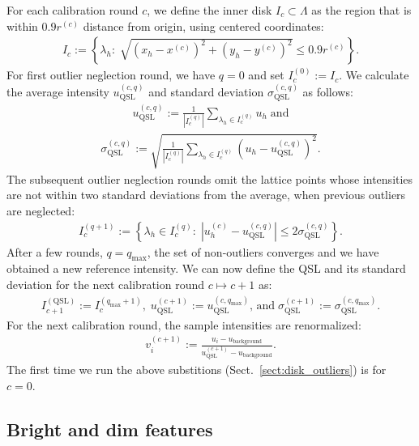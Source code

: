 \documentclass{aa}
\newcommand{\eqnl}[2]{\begin{eqnarray}\label{#1}#2\end{eqnarray}}
\newcommand{\s}[2]{{#1}_{\mathrm{#2}}}
\begin{document}
  For each calibration round $c$, we define the inner disk $I_c \subset \Lambda$ as the region that is within $0.9 r^{(c)}$ distance from origin, using centered coordinates:
  \eqnl{calib_inner_disk1}{
  I_c := \left\{ \lambda_h :\; \sqrt{\left( x_h - x^{(c)} \right)^2 + \left( y_h - y^{(c)} \right)^2} \le 0.9 r^{(c)} \right\} \text{.}
  }  
  For first outlier neglection round, we have $q=0$ and set $I_{c}^{(0)} := I_c$. We calculate the average intensity $\s{u}{QSL}^{(c,q)}$ and standard deviation $\s{\sigma}{QSL}^{(c,q)}$ as follows:
  \eqnl{calib_inner_disk2}{
  \s{u}{QSL}^{(c,q)} := \frac{1}{|I_{c}^{(q)}|} \sum \limits_{\lambda_h \in I_{c}^{(q)}} u_h \; \text{and}
  }
  \eqnl{calib_inner_disk3}{
  \s{\sigma}{QSL}^{(c,q)} := \sqrt{\frac{1}{|I_{c}^{(q)}|} \sum \limits_{\lambda_h \in I_{c}^{(q)}} \left( u_h - \s{u}{QSL}^{(c,q)} \right)^2} \text{.}
  }
  The subsequent outlier neglection rounds omit the lattice points whose intensities are not within two standard deviations from the average, when previous outliers are neglected:
  \eqnl{calib_inner_disk4}{
  I_c^{(q+1)} := \left\{ \lambda_h \in I_c^{(q)} :\; \left|u_h^{(c)} - \s{u}{QSL}^{(c,q)} \right| \le 2 \s{\sigma}{QSL}^{(c,q)} \right\} \text{.}
  }
  After a few rounds, $q = \s{q}{max}$, the set of non-outliers converges and we have obtained a new reference 
  intensity. We can now define the QSL and its standard deviation for the next calibration round $c \mapsto c+1$ as:
  \eqnl{calib_inner_disk5}{
  I_{c+1}^{(\mathrm{QSL})} := I_{c}^{(\s{q}{max}+1)},\; \s{u}{QSL}^{(c+1)} := \s{u}{QSL}^{(c,\s{q}{max})} \text{, and} \; \s{\sigma}{QSL}^{(c+1)} := \s{\sigma}{QSL}^{(c,\s{q}{max})} \text{.}
  }
  For the next calibration round, the sample intensities are renormalized:
  \eqnl{calib_inner_disk6}{
  v_i^{(c+1)} := \frac{u_i - \s{u}{background}}{\s{u}{QSL}^{(c+1)} - \s{u}{background}} \text{.}
  }
  The first time we run the above substitions (Sect.~\ref{sect:disk_outliers}) is for $c=0$.

  \subsection{Bright and dim features} \label{sect:bright_dim_features}
\end{document}
